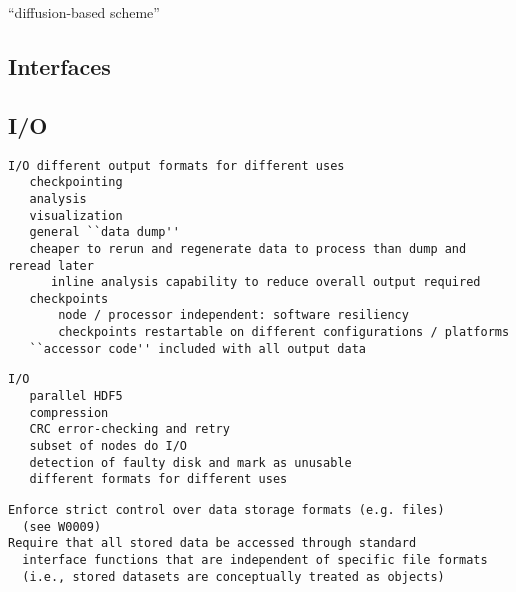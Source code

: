 \documentclass{article}
\begin{document}
``diffusion-based scheme''

% 





\subsection{Interfaces} \label{ss:design-interfaces}

\subsection{I/O} \label{ss:design-io}


\begin{verbatim}
I/O different output formats for different uses
   checkpointing
   analysis
   visualization
   general ``data dump''
   cheaper to rerun and regenerate data to process than dump and reread later
      inline analysis capability to reduce overall output required
   checkpoints
       node / processor independent: software resiliency
       checkpoints restartable on different configurations / platforms
   ``accessor code'' included with all output data
\end{verbatim}
\begin{verbatim}
I/O
   parallel HDF5
   compression
   CRC error-checking and retry
   subset of nodes do I/O
   detection of faulty disk and mark as unusable
   different formats for different uses
\end{verbatim}

\begin{verbatim}
Enforce strict control over data storage formats (e.g. files)
  (see W0009)
Require that all stored data be accessed through standard
  interface functions that are independent of specific file formats
  (i.e., stored datasets are conceptually treated as objects)
\end{verbatim}
\end{document}

